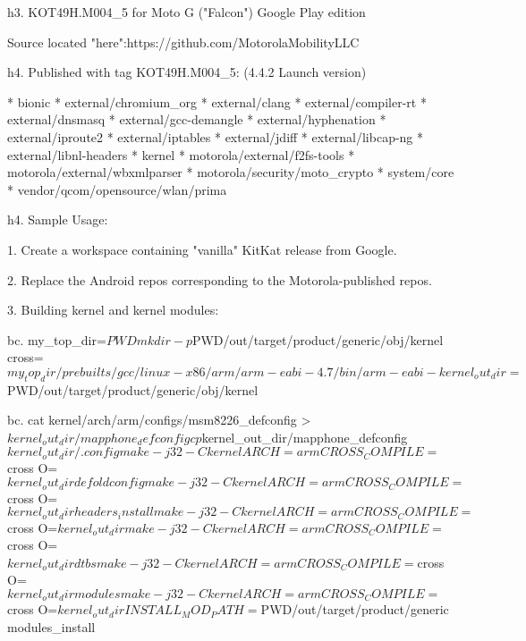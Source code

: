 h3. KOT49H.M004_5 for Moto G ("Falcon") Google Play edition

Source located "here":https://github.com/MotorolaMobilityLLC

h4. Published with tag KOT49H.M004_5: (4.4.2 Launch version)

* bionic
* external/chromium_org
* external/clang
* external/compiler-rt
* external/dnsmasq
* external/gcc-demangle
* external/hyphenation
* external/iproute2
* external/iptables
* external/jdiff
* external/libcap-ng
* external/libnl-headers
* kernel
* motorola/external/f2fs-tools
* motorola/external/wbxmlparser
* motorola/security/moto_crypto
* system/core
* vendor/qcom/opensource/wlan/prima

h4. Sample Usage:

1. Create a workspace containing "vanilla" KitKat release from Google.

2. Replace the Android repos corresponding to the Motorola-published repos.

3. Building kernel and kernel modules:

bc. my_top_dir=$PWD
mkdir -p $PWD/out/target/product/generic/obj/kernel
cross=$my_top_dir/prebuilts/gcc/linux-x86/arm/arm-eabi-4.7/bin/arm-eabi-
kernel_out_dir=$PWD/out/target/product/generic/obj/kernel


bc. cat kernel/arch/arm/configs/msm8226_defconfig > $kernel_out_dir/mapphone_defconfig
cp $kernel_out_dir/mapphone_defconfig $kernel_out_dir/.config
make -j32  -C kernel ARCH=arm  CROSS_COMPILE=$cross  O=$kernel_out_dir defoldconfig
make -j32 -C kernel ARCH=arm  CROSS_COMPILE=$cross  O=$kernel_out_dir headers_install
make  -j32 -C kernel ARCH=arm  CROSS_COMPILE=$cross  O=$kernel_out_dir
make  -j32 -C kernel ARCH=arm  CROSS_COMPILE=$cross  O=$kernel_out_dir dtbs
make  -j32 -C kernel ARCH=arm  CROSS_COMPILE=$cross  O=$kernel_out_dir modules
make  -j32 -C kernel ARCH=arm  CROSS_COMPILE=$cross  O=$kernel_out_dir INSTALL_MOD_PATH=$PWD/out/target/product/generic  modules_install

